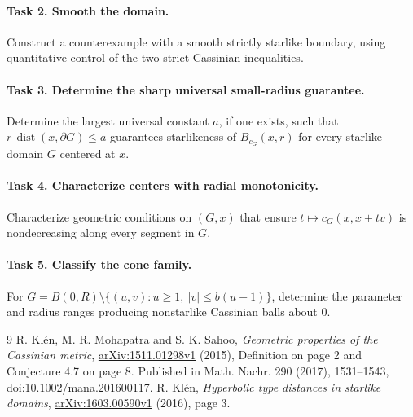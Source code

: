 \documentclass[11pt]{article}
\begin{document}
\paragraph{Task 2. Smooth the domain.}
Construct a counterexample with a smooth strictly starlike boundary,
using quantitative control of the two strict Cassinian inequalities.

\paragraph{Task 3. Determine the sharp universal small-radius guarantee.}
Determine the largest universal constant $a$, if one exists, such that
$r\,\operatorname{dist}(x,\partial G)\le a$ guarantees starlikeness of
$B_{c_G}(x,r)$ for every starlike domain $G$ centered at $x$.

\paragraph{Task 4. Characterize centers with radial monotonicity.}
Characterize geometric conditions on $(G,x)$ that ensure
$t\mapsto c_G(x,x+tv)$ is nondecreasing along every segment in $G$.

\paragraph{Task 5. Classify the cone family.}
For $G=B(0,R)\setminus\{(u,v):u\ge1,\ |v|\le b(u-1)\}$,
determine the parameter and radius ranges producing nonstarlike
Cassinian balls about $0$.

\begin{thebibliography}{9}
 R. Kl\'en, M. R. Mohapatra and S. K. Sahoo,
\emph{Geometric properties of the Cassinian metric},
\href{https://arxiv.org/abs/1511.01298}{arXiv:1511.01298v1} (2015),
Definition on page 2 and Conjecture 4.7 on page 8.
Published in Math. Nachr. 290 (2017), 1531--1543,
\href{https://doi.org/10.1002/mana.201600117}{doi:10.1002/mana.201600117}.
 R. Kl\'en, \emph{Hyperbolic type distances in starlike domains},
\href{https://arxiv.org/abs/1603.00590}{arXiv:1603.00590v1} (2016), page 3.
\end{thebibliography}
\end{document}
